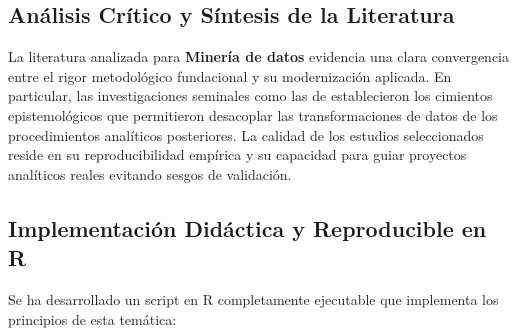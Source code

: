 \subsection{Análisis Crítico y Síntesis de la Literatura}
La literatura analizada para \textbf{Minería de datos} evidencia una clara convergencia entre el rigor metodológico fundacional y su modernización aplicada. 
En particular, las investigaciones seminales como las de \citeauthor{usama} establecieron los cimientos epistemológicos que permitieron desacoplar las transformaciones de datos de los procedimientos analíticos posteriores. 
La calidad de los estudios seleccionados reside en su reproducibilidad empírica y su capacidad para guiar proyectos analíticos reales evitando sesgos de validación.


\subsection{Implementación Didáctica y Reproducible en R}
Se ha desarrollado un script en R completamente ejecutable que implementa los principios de esta temática:
